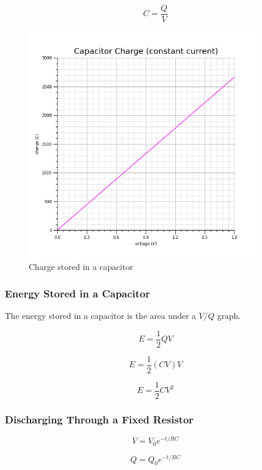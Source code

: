 \documentclass[12pt]{article}
\begin{document}
\[C = \dfrac{Q}{V}\]

\begin{figure}[H]
\centering
\includegraphics[width=0.9\textwidth,keepaspectratio]{./images/capacitor_charge_constant_current.png}
\caption{Charge stored in a capacitor}
\end{figure}

\subsubsection{Energy Stored in a Capacitor}
\label{sec:org95a2830}

The energy stored in a capacitor is the area under a \(V/Q\) graph.

\[E = \dfrac{1}{2} QV\]

\[E = \dfrac{1}{2} (CV)V\]

\[E = \dfrac{1}{2} CV^2\]

\subsubsection{Discharging Through a Fixed Resistor}
\label{sec:orgc862d5a}

\[V = V_0 e^{-t/RC}\]

\[Q = Q_0 e^{-t/RC}\]
\end{document}
